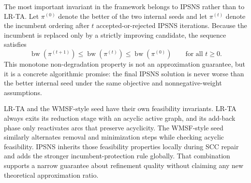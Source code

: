 The most important invariant in the framework belongs to IPSNS rather than to LR-TA. Let \(\pi^{(0)}\) denote the better of the two internal seeds and let \(\pi^{(t)}\) denote the incumbent ordering after \(t\) accepted-or-rejected IPSNS iterations. Because the incumbent is replaced only by a strictly improving candidate, the sequence satisfies
\begin{equation}
    \operatorname{bw}\!\left(\pi^{(t+1)}\right)
    \le
    \operatorname{bw}\!\left(\pi^{(t)}\right)
    \le
    \operatorname{bw}\!\left(\pi^{(0)}\right)
    \qquad \text{for all } t\ge 0.
    \label{eq:ipsns-monotone}
\end{equation}
This monotone non-degradation property is not an approximation guarantee, but it is a concrete algorithmic promise: the final IPSNS solution is never worse than the better internal seed under the same objective and nonnegative-weight assumptions.

LR-TA and the WMSF-style seed have their own feasibility invariants. LR-TA always exits its reduction stage with an acyclic active graph, and its add-back phase only reactivates arcs that preserve acyclicity. The WMSF-style seed similarly alternates removal and minimization steps while checking acyclic feasibility. IPSNS inherits those feasibility properties locally during SCC repair and adds the stronger incumbent-protection rule globally. That combination supports a narrow guarantee about refinement quality without claiming any new theoretical approximation ratio.
